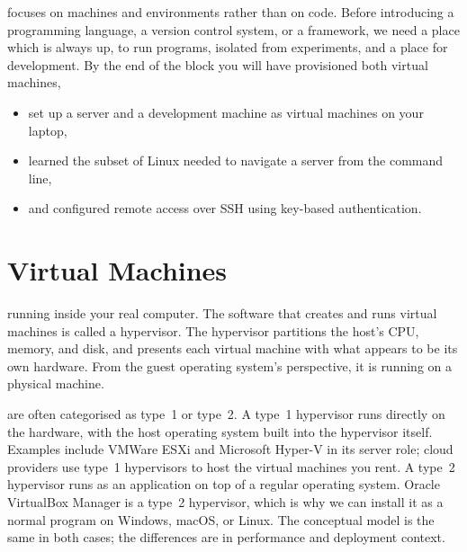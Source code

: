 
 focuses on machines and environments rather than on code.
Before introducing a programming language, a version control system, or a framework,
we need a place which is always up, to run programs, isolated from experiments, and a place for development.
By the end of the block you will have provisioned both virtual machines,
\begin{itemize}
    \item set up a server and a development machine as virtual machines on your laptop,
    \item learned the subset of Linux needed to navigate a server from the command line,
    \item and configured remote access over SSH using key-based authentication.
\end{itemize}





\newpage
\section{Virtual Machines}

 running inside your real computer.
The software that creates and runs virtual machines is called a hypervisor.
The hypervisor partitions the host's CPU, memory, and disk, and presents each virtual machine
with what appears to be its own hardware.
From the guest operating system's perspective, it is running on a physical machine.

 are often categorised as type~1 or type~2.
A type~1 hypervisor runs directly on the hardware,
with the host operating system built into the hypervisor itself.
Examples include VMWare ESXi and Microsoft Hyper-V in its server role;
cloud providers use type~1 hypervisors to host the virtual machines you rent.
A type~2 hypervisor runs as an application on top of a regular operating system.
Oracle VirtualBox Manager is a type~2 hypervisor, which is why we can install it as a normal program
on Windows, macOS, or Linux.
The conceptual model is the same in both cases; the differences are in performance and deployment context.


